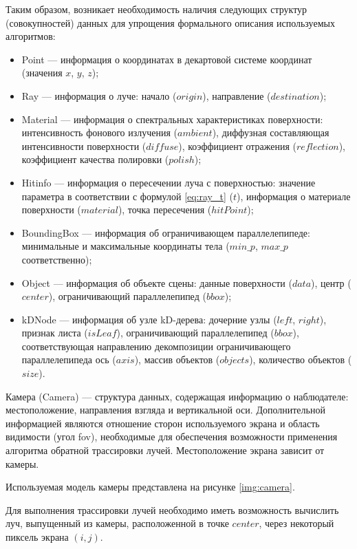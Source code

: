 Таким образом, возникает необходимость наличия следующих структур (совокупностей) данных для упрощения формального описания используемых алгоритмов:

\begin{itemize}
	\item Point --- информация о координатах в декартовой системе координат (значения $x$, $y$, $z$);
	\item Ray --- информация о луче: начало ($origin$), направление ($destination$);
	\item Material --- информация о спектральных характеристиках поверхности: интенсивность фонового излучения ($ambient$), диффузная составляющая интенсивности поверхности ($diffuse$), коэффициент отражения ($reflection$), коэффициент качества полировки ($polish$);
	\item Hitinfo --- информация о пересечении луча с поверхностью: значение параметра в соответствии с формулой \ref{eq:ray_t} ($t$), информация о материале поверхности ($material$), точка пересечения ($hitPoint$);
	\item BoundingBox --- информация об ограничивающем параллелепипеде: минимальные и максимальные координаты тела ($min\_p$, $max\_p$ соответственно);
	\item Object --- информация об объекте сцены: данные поверхности ($data$), центр ($center$), ограничивающий параллелепипед ($bbox$);
	\item kDNode --- информация об узле kD-дерева: дочерние узлы ($left$, $right$), признак листа ($isLeaf$), ограничивающий параллелепипед ($bbox$), соответствующая направлению декомпозиции ограничивающего параллелепипеда ось ($axis$), массив объектов ($objects$), количество объектов ($size$).
\end{itemize}

Камера (Camera) --- структура данных, содержащая информацию о наблюдателе: местоположение, направления взгляда и вертикальной оси.
Дополнительной информацией являются отношение сторон используемого экрана и область видимости (угол fov), необходимые для обеспечения возможности применения алгоритма обратной трассировки лучей.
Местоположение экрана зависит от камеры.

Используемая модель камеры представлена на рисунке \ref{img:camera}.


Для выполнения трассировки лучей необходимо иметь возможность вычислить луч, выпущенный из камеры, расположенной в точке $center$, через некоторый пиксель экрана $(i, j)$.

